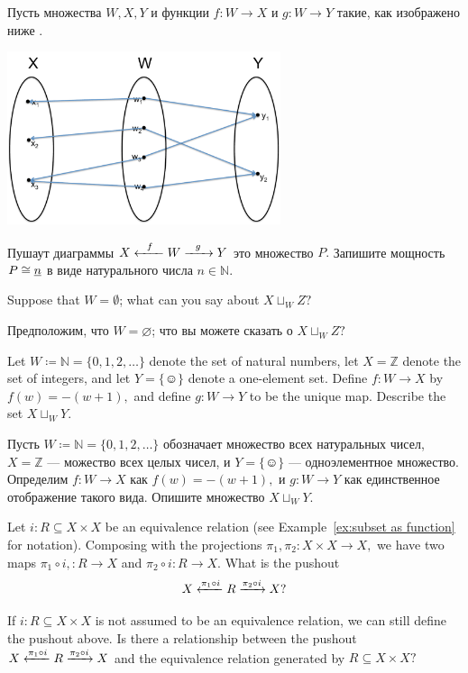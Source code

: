 \documentclass[../main/CT4S-EN-RU]{subfiles}
\begin{document}
\begin{exerciseRUS}
Пусть множества $W,X,Y$ и функции $f\colon W{→} X$ и $g\colon W{→} Y$ такие, как изображено ниже . 
\begin{center}
\includegraphics[height=2in]{setPushout}
\end{center}
Пушаут диаграммы $X\xleftarrow{\ \ f\ \ }W\xrightarrow{\ \ g\ \ }Y$ это множество $P.$ Запишите мощность $P\cong\underline{n}$ в виде натурального числа $n\in{ℕ}.$  
\end{exerciseRUS}

\begin{exerciseENG}
Suppose that $W=\emptyset$; what can you say about $X\sqcup_WZ?$ 
\end{exerciseENG}

\begin{exerciseRUS}
Предположим, что $W=\varnothing$; что вы можете сказать о $X\sqcup_WZ?$ 
\end{exerciseRUS}

\begin{exerciseENG}
Let $W{\coloneqq}{ℕ}=\{0,1,2,\ldots\}$ denote the set of natural numbers, let $X={ℤ}$ denote the set of integers, and let $Y={\{☺\}}$ denote a one-element set. Define $f\colon W{→} X$ by $f(w)= -(w+1),$ and define $g\colon W{→} Y$ to be the unique map. Describe the set $X\sqcup_WY.$
\end{exerciseENG}

\begin{exerciseRUS}
Пусть $W{\coloneqq}{ℕ}=\{0,1,2,\ldots\}$ обозначает множество всех натуральных чисел, $X={ℤ}$ — можество всех целых чисел, и $Y={\{☺\}}$ — одноэлементное множество. Определим $f\colon W{→} X$ как $f(w)= -(w+1),$ и $g\colon W{→} Y$ как единственное отображение такого вида. Опишите множество $X\sqcup_WY.$
\end{exerciseRUS}

\begin{exerciseENG}
Let $i\colon R\subseteq X\times X$ be an equivalence relation (see Example~\ref{ex:subset as function} for notation). Composing with the projections $\pi_1,\pi_2\colon X\times X{→} X,$ we have two maps $\pi_1\circ i,\colon R{→} X$ and $\pi_2\circ i\colon R{→} X.$ 
\sexc What is the pushout $$X\xleftarrow{\pi_1\circ i}R\xrightarrow{\pi_2\circ i}X?$$ 
\item If $i\colon R\subseteq X\times X$ is not assumed to be an equivalence relation, we can still define the pushout above. Is there a relationship between the pushout $X\xleftarrow{\pi_1\circ i}R\xrightarrow{\pi_2\circ i}X$ and the equivalence relation generated by $R\subseteq X\times X?$
\endsexc
\end{exerciseENG}
\end{document}
